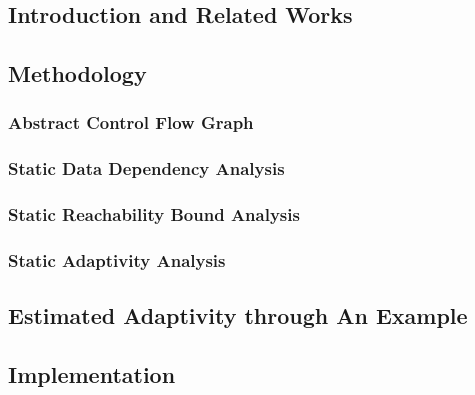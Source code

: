 \subsection{Introduction and Related Works}
\label{subsec:static-intro}


\subsection{Methodology}
\label{subsec:static-methodology}

\subsubsection{Abstract Control Flow Graph}
\label{subsubsec:static-abscfg}


\subsubsection{Static Data Dependency Analysis}
\label{subsubsec:static-datadep}


\subsubsection{Static Reachability Bound Analysis}
\label{subsubsec:static-reachability}


\subsubsection{Static Adaptivity Analysis}
\label{subsubsec:static-adapt}


\subsection{Estimated Adaptivity through An Example}
\label{subsec:static-examples}

%
\subsection{Implementation}
\label{subsec:static-implementation}
